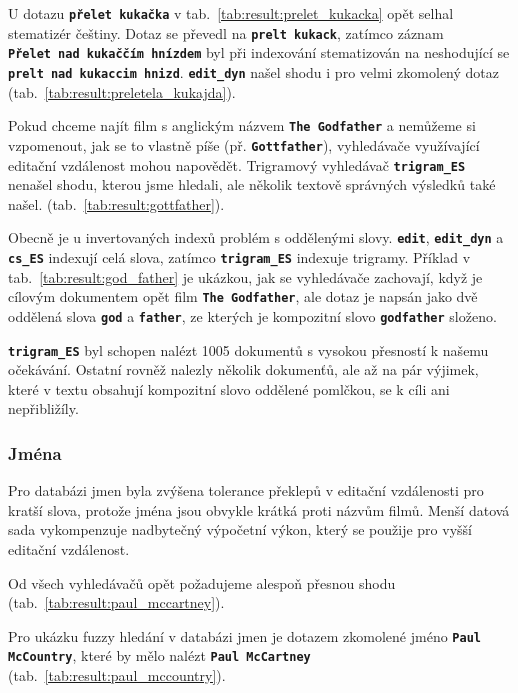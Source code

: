 \documentclass[11pt,letterpaper,oneside,openright]{book}
\newcommand{\bftt}[1]{\texttt{\textbf{#1}}}
\begin{document}
U dotazu \bftt{přelet~kukačka} v tab.~\ref{tab:result:prelet_kukacka} opět
selhal stematizér češtiny. Dotaz se převedl na \bftt{prelt~kukack}, zatímco
záznam \bftt{Přelet~nad~kukaččím~hnízdem} byl při indexování stematizován na
neshodující se \bftt{prelt~nad~kukaccim~hnizd}. \bftt{edit\_dyn} našel shodu i
pro velmi zkomolený dotaz (tab.~\ref{tab:result:preletela_kukajda}).

\mbox{}\mbox{}

Pokud chceme najít film s anglickým názvem \bftt{The Godfather} a nemůžeme si
vzpomenout, jak se to vlastně píše (př. \bftt{Gottfather}), vyhledávače
využívající editační vzdálenost mohou napovědět. Trigramový vyhledávač
\bftt{trigram\_ES} nenašel shodu, kterou jsme hledali, ale několik textově
správných výsledků také našel.  (tab.~\ref{tab:result:gottfather}).

\mbox{}\mbox{}

Obecně je u invertovaných indexů problém s oddělenými slovy. \bftt{edit},
\bftt{edit\_dyn} a \bftt{cs\_ES} indexují celá slova, zatímco
\bftt{trigram\_ES} indexuje trigramy. Příklad v
tab.~\ref{tab:result:god_father} je ukázkou, jak se vyhledávače zachovají, když
je cílovým dokumentem opět film \bftt{The Godfather}, ale dotaz je napsán jako
dvě oddělená slova \bftt{god} a \bftt{father}, ze kterých je kompozitní slovo
\bftt{godfather} složeno.

\bftt{trigram\_ES} byl schopen nalézt 1005 dokumentů s vysokou přesností k
našemu očekávání. Ostatní rovněž nalezly několik dokumenťů, ale až na pár
výjimek, které v textu obsahují kompozitní slovo oddělené pomlčkou, se k cíli
ani nepřibližíly.

\subsubsection{Jména}
Pro databázi jmen byla zvýšena tolerance překlepů v editační vzdálenosti pro
kratší slova, protože jména jsou obvykle krátká proti názvům filmů. Menší
datová sada vykompenzuje nadbytečný výpočetní výkon, který se použije pro vyšší
editační vzdálenost.

\mbox{}\mbox{}

Od všech vyhledávačů opět požadujeme alespoň přesnou shodu
(tab.~\ref{tab:result:paul_mccartney}).

\mbox{}\mbox{}

Pro ukázku fuzzy hledání v databázi jmen je dotazem zkomolené jméno
\bftt{Paul McCountry}, které by mělo nalézt \bftt{Paul McCartney}
(tab.~\ref{tab:result:paul_mccountry}).
\end{document}
